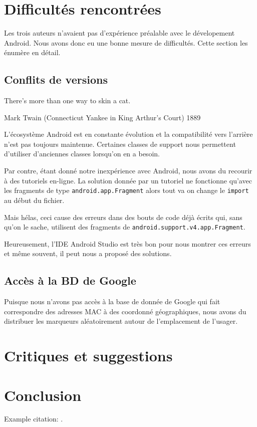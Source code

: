 \documentclass[12pt]{article}
\newcommand\code[1]{\texttt{#1}}
\begin{document}


\section{Difficultés rencontrées}

	Les trois auteurs n'avaient pas d'expérience préalable avec le dévelopement
	Android.  Nous avons donc eu une bonne mesure de difficultés.  Cette section
	les énumère en détail.

\subsection{Conflits de versions}

	{\center \og There's more than one way to skin a cat.\fg \\}
		\begin{flushright}
			{\flushright Mark Twain (Connecticut Yankee in King Arthur’s Court)
			1889}
		\end{flushright}

	L'écosystème Android est en constante évolution et la compatibilité vers
	l'arrière n'est pas toujours maintenue.  Certaines classes de support nous
	permettent d'utiliser d'anciennes classes lorsqu'on en a besoin.

	Par contre, étant donné notre inexpérience avec Android, nous avons du
	recourir à des tutoriels en-ligne.  La solution donnée par un tutoriel ne
	fonctionne qu'avec les fragments de type  \code{android.app.Fragment} alors
	tout va on change le \code{import} au début du fichier.

	Mais hélas, ceci cause des erreurs dans des bouts de code déjà écrits qui,
	sans qu'on le sache, utilisent des fragments de
	\code{android.support.v4.app.Fragment}.

	Heureusement, l'IDE Android Studio est très bon pour nous montrer ces
	erreurs et même souvent, il peut nous a proposé des solutions.

\subsection{Accès à la BD de Google}

	Puisque nous n'avons pas accès à la base de donnée de Google qui fait
	correspondre des adresses MAC à des coordonné géographiques, nous avons du
	distribuer les marqueurs aléatoirement autour de l'emplacement de
	l'usager.



\section{Critiques et suggestions}
\section{Conclusion}
Example citation: .



\end{document}

